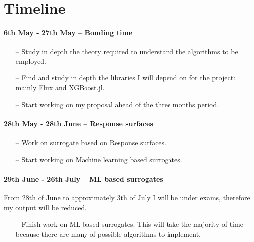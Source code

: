 \documentclass[11pt,a4paper,oneside,titlepage,openright]{book}
\begin{document}
   
\chapter*{Timeline}

\subsubsection*{6th May - 27th May -- Bonding time}

\begin{itemize}
\item[--] Study in depth the theory required to understand the algorithms to be employed.
\item[--] Find and study in depth the libraries I will depend on for the project: mainly Flux and XGBoost.jl.
\item[--] Start working on my proposal ahead of the three months period. 
\end{itemize}

\subsubsection*{28th May - 28th June -- Response surfaces}

\begin{itemize}
\item[--] Work on surrogate based on Response surfaces. 
\item[--] Start working on Machine learning based surrogates.
\end{itemize}

\subsubsection*{29th June - 26th July -- ML based surrogates}

From 28th of June to approximately 3th of July I will be under exams, therefore my output will be reduced. \\
\begin{itemize}
\item[--] Finish work on ML based surrogates. This will take the majority of time because there are many of possible algorithms to implement.
\end{itemize}
\end{document}
